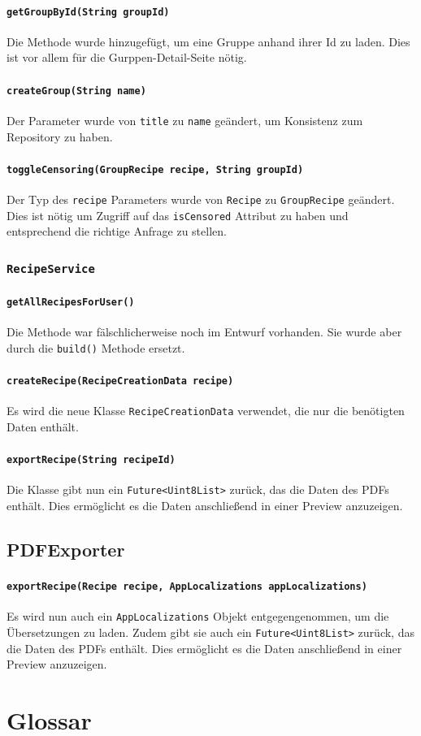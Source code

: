 \documentclass{implementierungsheft}
\begin{document}
\paragraph*{\texttt{getGroupById(String groupId)}}
Die Methode wurde hinzugefügt, um eine Gruppe anhand ihrer Id zu laden. Dies ist vor allem für die Gurppen-Detail-Seite nötig.
\paragraph{\texttt{createGroup(String name)}}
Der Parameter wurde von \texttt{title} zu \texttt{name} geändert, um Konsistenz zum Repository zu haben.
\paragraph{\texttt{toggleCensoring(GroupRecipe recipe, String groupId)}}
Der Typ des \texttt{recipe} Parameters wurde von \texttt{Recipe} zu \texttt{GroupRecipe} geändert. Dies ist nötig um Zugriff auf das \texttt{isCensored} Attribut zu haben und entsprechend die richtige Anfrage zu stellen.
\subsubsection{\texttt{RecipeService}}
\paragraph{\texttt{getAllRecipesForUser()}}
Die Methode war fälschlicherweise noch im Entwurf vorhanden. Sie wurde aber durch die \texttt{build()} Methode ersetzt.
\paragraph{\texttt{createRecipe(RecipeCreationData recipe)}}
Es wird die neue Klasse \texttt{RecipeCreationData} verwendet, die nur die benötigten Daten enthält.
\paragraph{\texttt{exportRecipe(String recipeId)}}
Die Klasse gibt nun ein \texttt{Future<Uint8List>} zurück, das die Daten des PDFs enthält. Dies ermöglicht es die Daten anschließend in einer Preview anzuzeigen.
\subsection{PDFExporter}
\paragraph{\texttt{exportRecipe(Recipe recipe, AppLocalizations appLocalizations)}}
Es wird nun auch ein \texttt{AppLocalizations} Objekt entgegengenommen, um die Übersetzungen zu laden. Zudem gibt sie auch ein \texttt{Future<Uint8List>} zurück, das die Daten des PDFs enthält. Dies ermöglicht es die Daten anschließend in einer Preview anzuzeigen.
\newpage
\section{Glossar}
\printglossary[style=altlist]
\end{document}
